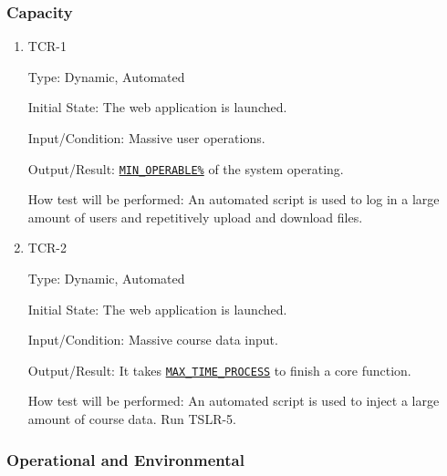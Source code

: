 \documentclass[12pt, titlepage]{article}
\begin{document}
\subsubsection{Capacity}

\begin{enumerate}
\item{TCR-1\\}\label{TCR-1}

Type: Dynamic, Automated
					
Initial State: The web application is launched.
					
Input/Condition: Massive user operations.
					
Output/Result: \hyperref[MIN_OPERABLE]{\texttt{MIN\_OPERABLE\%}} of the system operating.
					
How test will be performed: An automated script is used to log in a large amount of users and repetitively upload and download files.

\item{TCR-2\\}\label{TCR-2}

Type: Dynamic, Automated
					
Initial State: The web application is launched.
					
Input/Condition: Massive course data input.
					
Output/Result: It takes \hyperref[MAX_TIME_PROCESS]{\texttt{MAX\_TIME\_PROCESS}} to finish a core function.
					
How test will be performed: An automated script is used to inject a large amount of course data.  Run TSLR-5.

\end{enumerate}

\subsubsection{Operational  and Environmental}
\end{document}
